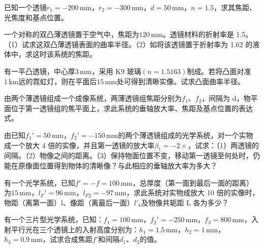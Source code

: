 \documentclass[padl, analysis, notocnum]{ExBook}
\newcommand{\answerarea}[1][3.5cm]{%
  \par\vspace{1mm}%
  \noindent{\color{themeColor!35}\rule{\linewidth}{0.4pt}}\par
  \noindent\begin{minipage}[t][#1][t]{\linewidth}\vspace{0pt}\end{minipage}\par
  \noindent{\color{themeColor!35}\rule{\linewidth}{0.4pt}}\par
}
\begin{document}
\begin{qitems}[startnum=7]
\qitem 已知一个透镜$r_{1}=-200\,\mathrm{mm}$，$r_{2}=-300\,\mathrm{mm}$，$d=50\,\mathrm{mm}$，$n=1.5$，求其焦距、光焦度和基点位置。
\label{q:44:start}
\answerarea[7.0cm]
\label{q:44:end}
\end{qitems}

\begin{qitems}[startnum=8]
\qitem 一个对称的双凸薄透镜置于空气中，焦距为$120\,\mathrm{mm}$。透镜材料的折射率是 1.5。（1）试求这双凸薄透镜表面的曲率半径。（2）如将该透镜置于折射率为 1.62 的液体中，求这时该系统的焦距。
\label{q:45:start}
\answerarea[7.0cm]
\label{q:45:end}
\end{qitems}

\begin{qitems}[startnum=9]
\qitem 有一平凸透镜，中心厚$3\,\mathrm{mm}$，采用 K9 玻璃$(n=1.5163)$制成。若将凸面对准$1\,\mathrm{km}$远的霓虹灯，则在平面后$15\,\mathrm{mm}$处可得到清晰实像。试求凸面曲率半径。
\label{q:46:start}
\answerarea[7.0cm]
\label{q:46:end}
\end{qitems}

\begin{qitems}[startnum=10]
\qitem 由两个薄透镜组成一个成像系统，两薄透镜组焦距分别为$f_{1}$、$f_{2}$，间隔为 d，物平面位于第一透镜组的焦平面上，求此系统的垂轴放大率、焦距及基点位置的表达式。
\label{q:47:start}
\answerarea[7.0cm]
\label{q:47:end}
\end{qitems}

\begin{qitems}[startnum=11]
\qitem 由已知$f_{1}'=50\,\mathrm{mm}$，$f_{2}'=-150\,\mathrm{mm}$的两个薄透镜组成的光学系统，对一个实物成一个放大 4 倍的实像，并且第一透镜的放大率$\beta_{1}=-2\times$，试求：（1）两透镜的间隔。（2）物像之间的距离。（3）保持物面位置不变，移动第一透镜至何处时，仍能在原像面位置得到物体的清晰像？与此相应的垂轴放大率为多大？
\label{q:48:start}
\answerarea[7.0cm]
\label{q:48:end}
\end{qitems}

\begin{qitems}[startnum=12]
\qitem 有一个光学系统，已知$f'=-f=100\,\mathrm{mm}$，总厚度（第一面到最后一面的距离）为$15\,\mathrm{mm}$，$l_{F}'=96\,\mathrm{mm}$，$l_{F2}=-97\,\mathrm{mm}$，求此系统对实物成放大 10 倍的实像时，物距（离第一面）l、像距（离最后一面）$l'_{k}$及物像共轭距 L 各为多少？
\label{q:49:start}
\answerarea[7.0cm]
\label{q:49:end}
\end{qitems}

\begin{qitems}[startnum=13]
\qitem 有一个三片型光学系统，已知：$f_{1}=100\,\mathrm{mm}$，$f_{2}'=-250\,\mathrm{mm}$，$f_{3}=800\,\mathrm{mm}$，入射平行光在三个透镜上的入射高度分别为：$h_{1}=1.5\,\mathrm{mm}$，$h_{2}=1\,\mathrm{mm}$，$h_{3}=0.9\,\mathrm{mm}$，试求合成焦距$f'$和间隔$d_{1}$、$d_{2}$的值。
\label{q:50:start}
\answerarea[7.0cm]
\label{q:50:end}
\end{qitems}
\end{document}
